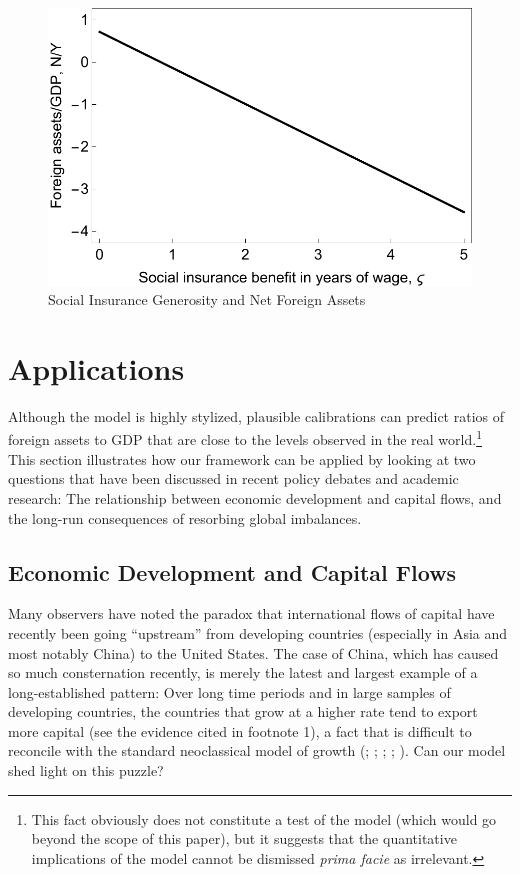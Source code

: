\documentclass[titlepage]{\econtex}\newcommand{\texname}{cjSOE}
\begin{document}
\medskip
\begin{figure}
\includegraphics{./Figures/socIns}
\caption{Social Insurance Generosity and Net Foreign Assets}\label{fig:socIns}
\end{figure}

\medskip



\section{Applications}

Although the model is highly stylized, plausible calibrations can
predict ratios of foreign assets to GDP that are close to the levels
observed in the real world.\footnote{This fact obviously does not constitute a
test of the model (which would go beyond the scope of this paper), but
it suggests that the quantitative implications of the model cannot be
dismissed {\it prima facie} as irrelevant.} This section illustrates
how our framework can be applied by looking at two questions that have
been discussed in recent policy debates and academic research: The
relationship between economic development and capital flows, and the
long-run consequences of resorbing global imbalances.

\subsection{Economic Development and Capital Flows}

Many observers have noted the paradox that international flows of
capital have recently been going ``upstream'' from developing
countries (especially in Asia and most notably China) to the United
States. The case of China, which has caused so much consternation
recently, is merely the latest and largest example of a
long-established pattern: Over long time periods and in large samples
of developing countries, the countries that grow at a higher rate tend
to export more capital (see the evidence cited in footnote 1), a fact
that is difficult to reconcile with the standard neoclassical model of
growth (\cite{carroll&weil:crcs}; \cite{cow:habits};
\cite{gourinchasJeannePuzzle}; \cite{prs:brookings};
\cite{sandri:growthcapflows}). Can our model shed light on this
puzzle?
\end{document}
